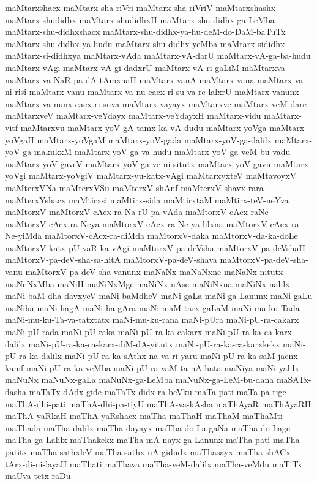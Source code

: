 {maMtarxshacx
maMtarx-sha-riVri
maMtarx-sha-riVriV
maMtarxshashx
maMtarx-shudidhx
maMtarx-shudidhxH
maMtarx-shu-didhx-ga-LeMba
maMtarx-shu-didhxshacx
maMtarx-shu-didhx-ya-hu-deM-do-DaM-baTuTx
maMtarx-shu-didhx-ya-hudu
maMtarx-shu-didhx-yeMba
maMtarx-sididhx
maMtarx-si-didhxya
maMtarx-vAda
maMtarx-vA-darU
maMtarx-vA-ga-ba-hudu
maMtarx-vAgi
maMtarx-vA-gi-dadxrU
maMtarx-vA-ri-gaLiM
maMtarxva
maMtarx-va-NaR-pa-dA-tAmxnaH
maMtarx-vanA
maMtarx-vana
maMtarx-va-ni-risi
maMtarx-vanu
maMtarx-va-nu-cacx-ri-su-va-re-lalxrU
maMtarx-vanunx
maMtarx-va-nunx-cacx-ri-suva
maMtarx-vayayx
maMtarxve
maMtarx-veM-dare
maMtarxveV
maMtarx-veYdayx
maMtarx-veYdayxH
maMtarx-vidu
maMtarx-vitf
maMtarxvu
maMtarx-yoV-gA-tamx-ka-vA-dudu
maMtarx-yoVga
maMtarx-yoVgaH
maMtarx-yoVgaM
maMtarx-yoV-gada
maMtarx-yoV-ga-dalilx
maMtarx-yoV-ga-makukxM
maMtarx-yoV-ga-va-hudu
maMtarx-yoV-ga-veM-bu-vadu
maMtarx-yoV-gaveV
maMtarx-yoV-ga-ve-ni-situtx
maMtarx-yoV-gavu
maMtarx-yoVgi
maMtarx-yoVgiV
maMtarx-yu-katx-vAgi
maMtarxyxteV
maMtavoyxV
maMterxVNa
maMterxVSu
maMterxV-shAnf
maMterxV-shavx-rara
maMterxYshacx
maMtirxsi
maMtirx-sida
maMtirxtaM
maMtirx-teV-neYva
maMtorxV
maMtorxV-cAcx-ra-Na-rU-pa-vAda
maMtorxV-cAcx-raNe
maMtorxV-cAcx-ra-Neya
maMtorxV-cAcx-ra-Ne-ya-lilxna
maMtorxV-cAcx-ra-Ne-yiMda
maMtorxV-cAcx-ra-diMda
maMtorxV-daka
maMtorxV-da-ka-doLe
maMtorxV-katx-pU-vaR-ka-vAgi
maMtorxV-pa-deVsha
maMtorxV-pa-deVshaH
maMtorxV-pa-deV-sha-sa-hitA
maMtorxV-pa-deV-shava
maMtorxV-pa-deV-sha-vanu
maMtorxV-pa-deV-sha-vanunx
maNaNx
maNaNxne
maNaNx-nitutx
maNeNxMba
maNiH
maNiNxMge
maNiNx-nAse
maNiNxna
maNiNx-nalilx
maNi-baM-dha-davxyeV
maNi-baMdheV
maNi-gaLa
maNi-ga-Lanunx
maNi-gaLu
maNiha
maNi-hagA
maNi-ha-gAra
maNi-maM-tarx-gaLaM
maNi-ma-ku-Tada
maNi-mu-ku-Ta-va-tatxtatx
maNi-mu-ku-rana
maNi-pUra
maNi-pU-ra-cakarx
maNi-pU-rada
maNi-pU-raka
maNi-pU-ra-ka-cakarx
maNi-pU-ra-ka-ca-karx-dalilx
maNi-pU-ra-ka-ca-karx-diM-dA-yitutx
maNi-pU-ra-ka-ca-karxkekx
maNi-pU-ra-ka-dalilx
maNi-pU-ra-ka-sAthx-na-va-ri-yaru
maNi-pU-ra-ka-saM-jacnx-kamf
maNi-pU-ra-ka-veMba
maNi-pU-ra-vaM-ta-nA-hata
maNiya
maNi-yalilx
maNuNx
maNuNx-gaLa
maNuNx-ga-LeMba
maNuNx-ga-LeM-bu-dana
maSATx-dasha
maTaTx-dAdx-gide
maTaTx-didx-ra-beVku
maTa-pati
maTa-pa-tige
maThA-dhi-pati
maThA-dhi-pa-tiyU
maThA-va-kAsha
maThAyaR
maThAyaRH
maThA-yaRkaH
maThA-yaRshacx
maTha
maThaH
maThaM
maThaMti
maThada
maTha-dalilx
maTha-dayayx
maTha-do-La-gaNa
maTha-do-Lage
maTha-ga-Lalilx
maThakekx
maTha-mA-nayx-ga-Lanunx
maTha-pati
maTha-patitx
maTha-sathxleV
maTha-sathx-nA-gidudx
maThasayx
maTha-shACx-tArx-di-ni-layaH
maThati
maThava
maTha-veM-dalilx
maTha-veMdu
maTiTx
maUva-tetx-raDu
}
